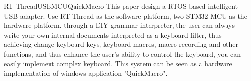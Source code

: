 
\begin{Eabstract}{RT-Thread}{USB}{MCU}{QuickMacro}{}
This paper design a RTOS-based intelligent USB adapter. Use RT-Thread as the software platform, two STM32 MCU as the hardware platform. through a DIY grammar interpreter, the user can always write your own internal documents interpreted as a keyboard filter, thus achieving change keyboard keys, keyboard macros, macro recording and other functions, and thus enhance the user's ability to control the keyboard, you can easily implement complex keyboard. This system can be seen as a hardware implementation of windows application "QuickMacro".
\end{Eabstract}
